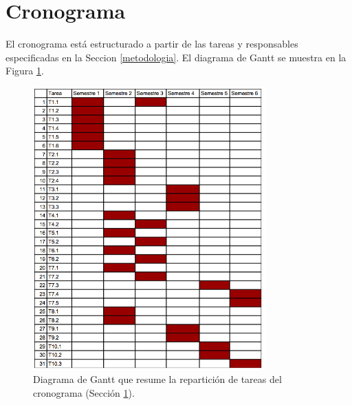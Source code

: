 \section{Cronograma}
\label{cronograma}

El cronograma est\'a estructurado a partir de las tareas y responsables especificadas en la Seccion \ref{metodologia}. 
El diagrama de Gantt se muestra en la Figura \ref{gantt}.

\begin{figure}
\begin{center}
\includegraphics[width=0.80\textwidth]{gantt_chart.png}
\end{center}
\caption{Diagrama de Gantt que resume la repartici\'on de tareas del cronograma (Secci\'on \ref{cronograma}).
\label{gantt}}
\end{figure}

